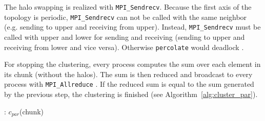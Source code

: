 \documentclass[twoside,11pt]{article}
\def\perc{\texttt{perco\-late}}
\begin{document}
The halo swapping is realized with \texttt{MPI\_Sendrecv}.
Because the first axis of the topology is periodic,
\texttt{MPI\_Sendrecv} can not be called with the same
neighbor (e.g. sending to upper and receiving from upper).
Instead, \texttt{MPI\_Sendrecv} must be called with
upper and lower for sending and receiving (sending to
upper and receiving from lower and vice versa).
Otherwise \perc{} would deadlock
\citep[see][Chapter 3]{mpi}.

For stopping the clustering, every process computes the
sum over each element in its chunk (without the halos).
The sum is then reduced and broadcast to every process
with \texttt{MPI\_Allreduce} \citep[see][Chapter 5]{mpi}.
If the reduced sum is equal to the sum generated by the
previous step, the clustering is finished (see
Algorithm~\ref{alg:cluster_par}).

\begin{algorithm} %
  \caption{: $c_{par}$(chunk)}
  \label{alg:cluster_par}

  \begin{algorithmic}[1]
      \ENDIF
    \ENDWHILE
  \end{algorithmic}
\end{algorithm} %
\end{document}
